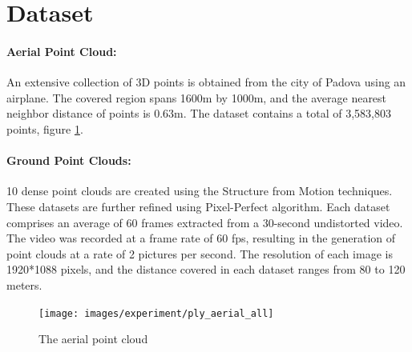 \documentclass[11pt]{article}
\begin{document}
    \section{Dataset}
    \paragraph{Aerial Point Cloud:} An extensive collection of 3D points is obtained from the city of Padova
    using an airplane. The covered region spans 1600m by 1000m, and the average nearest neighbor distance
    of points is 0.63m. The dataset contains a total of 3,583,803 points, figure \ref{fig:ply_aerial_all}.
    \paragraph{Ground Point Clouds:} 10 dense point clouds are created using the Structure from Motion techniques.
    These datasets are further refined using Pixel-Perfect algorithm. Each dataset comprises an average of
    60 frames extracted from a 30-second undistorted video. The video was recorded at a frame rate of 60 fps,
    resulting in the generation of point clouds at a rate of 2 pictures per second. The resolution of each image
    is 1920*1088 pixels, and the distance covered in each dataset ranges from 80 to 120 meters.

    \begin{figure}
    \centering
    \texttt{[image: images/experiment/ply\_aerial\_all]}
    \caption{The aerial point cloud}
    \label{fig:ply_aerial_all}
    \end{figure}
\end{document}
